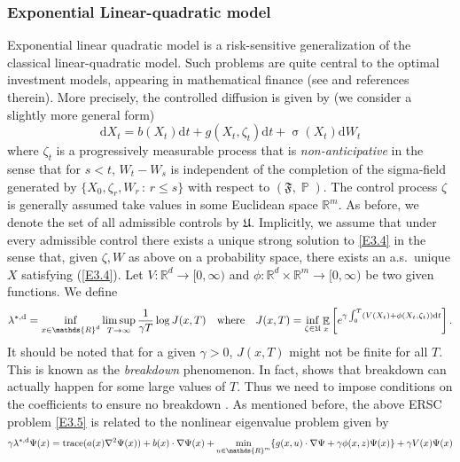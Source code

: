 \documentclass[notitlepage,11pt,reqno]{amsart}
\numberwithin{equation}{section}
\theoremstyle{plain}
\theoremstyle{definition}
\theoremstyle{remark}
\newcommand{\Uadm}{\mathfrak{U}}
\newcommand{\lamstrdf}{\lambda^{*,{\rm d}}}
\newcommand{\RR}{\mathds{R}} %
\newcommand{\Rd}{{\mathds{R}^{d}}}
\DeclareMathOperator{\Exp}{\mathbb{E}} %
\DeclareMathOperator{\Prob}{\mathbb{P}} %
\newcommand{\D}{\mathrm{d}} %
\DeclareMathOperator*{\trace}{trace}
\newcommand{\grad}{\nabla}
\begin{document}
\subsubsection{Exponential Linear-quadratic model}\label{S-ELQ}
Exponential linear quadratic model is a risk-sensitive generalization of the classical linear-quadratic model. Such problems are quite central to the optimal investment models, appearing in  mathematical finance
(see \cite{MR1890061,MR2083714,Fleming-00,MR1972534} and references therein).
More precisely, the controlled diffusion is given by (we consider a slightly more general form)
\begin{equation}\label{E3.4}
\D{X}_t = b(X_t)\D{t} + g(X_t, \zeta_t)\D{t} + \upsigma(X_t) \D{W}_t
\end{equation}
where $\zeta_t$ is a progressively measurable process that is {\it non-anticipative} in the sense that for $s<t$,  $W_t-W_s$ is independent of
the completion of the sigma-field generated by $\{X_0, \zeta_r, W_r\, :\, r\leq s\}$ with respect to $(\mathfrak{F}, \Prob)$.
The control process $\zeta$ is generally assumed take values in some Euclidean space $\RR^m$. As before, we denote the set of all
admissible controls by $\Uadm$. Implicitly, we assume that under every admissible control there exists a  unique strong solution to \eqref{E3.4} in the sense that, given $\zeta, W$ as above on a probability space, there exists an a.s.\ unique $X$ satisfying (\ref{E3.4}).
Let $V:\Rd\to [0, \infty)$ and $\phi:\Rd\times\RR^m\to [0, \infty)$ be two given functions. We define
\begin{equation}\label{E3.5}
\lamstrdf=\inf_{x\in\Rd}\limsup_{T\to\infty} \frac{1}{\gamma T} \log J(x, T)\quad \text{where}\quad J(x, T)=\inf_{\zeta\in\Uadm}\Exp_x\left[e^{\gamma\int_0^T (V(X_t)+\phi(X_t, \zeta_t))\D{t}} \right].
\end{equation}
It should be noted that for a given $\gamma>0$, $J(x, T)$ might not be finite for all $T$. This is known as the {\it breakdown} phenomenon. In fact, \cite[Example~1]{MR1784170} shows that
breakdown can actually happen for some large values of $T$. Thus we need to impose conditions on the coefficients to ensure no breakdown 
\cite{MR1485061,MR1372906}. As mentioned before, the above ERSC problem \eqref{E3.5} is related to the nonlinear eigenvalue problem given by
\begin{equation*}
\gamma\lamstrdf \Psi(x) = \trace(a(x)\grad^2\Psi(x)) + b(x)\cdot \grad\Psi(x) + \min_{u\in\RR^m} \{ g(x, u)\cdot \grad \Psi + \gamma\phi(x, z) \Psi(x)\} + \gamma V(x)\Psi(x)
\end{equation*}
\end{document}
